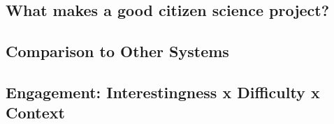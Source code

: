 \documentclass{sigchi}
\begin{document}
\subsection{What makes a good citizen science project?}

\subsection{Comparison to Other Systems}



%



\subsection{Engagement: Interestingness x Difficulty x Context}
\end{document}
